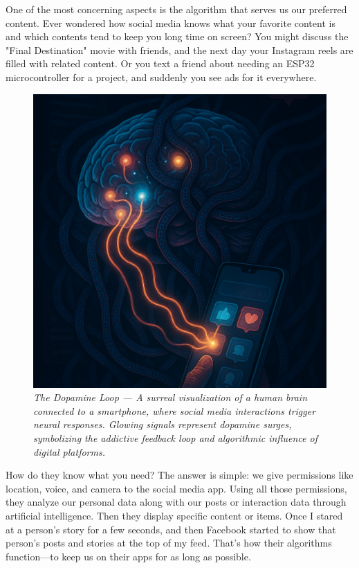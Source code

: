\documentclass[a4paper,10pt,twocolumn]{memoir}
\begin{document}
One of the most concerning aspects is the algorithm that serves us our preferred content. Ever wondered how social media knows what your favorite content is and which contents tend to keep you long time on screen? You might discuss the "Final Destination" movie with friends, and the next day your Instagram reels are filled with related content. Or you text a friend about needing an ESP32 microcontroller for a project, and suddenly you see ads for it everywhere.

\begin{figure}[h!]
  \centering
  \includegraphics[width=0.9\linewidth]{brended.png}
  \caption*{\textit{The Dopamine Loop — A surreal visualization of a human brain connected to a smartphone, where social media interactions trigger neural responses. Glowing signals represent dopamine surges, symbolizing the addictive feedback loop and algorithmic influence of digital platforms.}}
\end{figure}

How do they know what you need? The answer is simple: we give permissions like location, voice, and camera to the social media app. Using all those permissions, they analyze our personal data along with our posts or interaction data through artificial intelligence. Then they display specific content or items. Once I stared at a person’s story for a few seconds, and then Facebook started to show that person’s posts and stories at the top of my feed. That’s how their algorithms function—to keep us on their apps for as long as possible.
\end{document}
